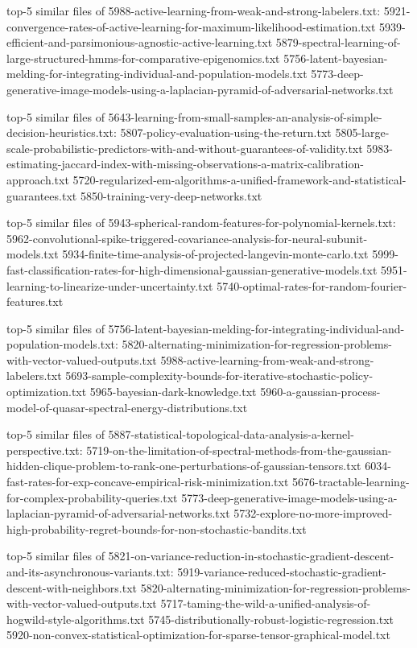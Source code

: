 \documentclass[11pt]{article}
\begin{document}
top-5 similar files of
5988-active-learning-from-weak-and-strong-labelers.txt:
5921-convergence-rates-of-active-learning-for-maximum-likelihood-estimation.txt
5939-efficient-and-parsimonious-agnostic-active-learning.txt
5879-spectral-learning-of-large-structured-hmms-for-comparative-epigenomics.txt
5756-latent-bayesian-melding-for-integrating-individual-and-population-models.txt
5773-deep-generative-image-models-using-a-laplacian-pyramid-of-adversarial-networks.txt

top-5 similar files of
5643-learning-from-small-samples-an-analysis-of-simple-decision-heuristics.txt:
5807-policy-evaluation-using-the-return.txt
5805-large-scale-probabilistic-predictors-with-and-without-guarantees-of-validity.txt
5983-estimating-jaccard-index-with-missing-observations-a-matrix-calibration-approach.txt
5720-regularized-em-algorithms-a-unified-framework-and-statistical-guarantees.txt
5850-training-very-deep-networks.txt

top-5 similar files of
5943-spherical-random-features-for-polynomial-kernels.txt:
5962-convolutional-spike-triggered-covariance-analysis-for-neural-subunit-models.txt
5934-finite-time-analysis-of-projected-langevin-monte-carlo.txt
5999-fast-classification-rates-for-high-dimensional-gaussian-generative-models.txt
5951-learning-to-linearize-under-uncertainty.txt
5740-optimal-rates-for-random-fourier-features.txt

top-5 similar files of
5756-latent-bayesian-melding-for-integrating-individual-and-population-models.txt:
5820-alternating-minimization-for-regression-problems-with-vector-valued-outputs.txt
5988-active-learning-from-weak-and-strong-labelers.txt
5693-sample-complexity-bounds-for-iterative-stochastic-policy-optimization.txt
5965-bayesian-dark-knowledge.txt
5960-a-gaussian-process-model-of-quasar-spectral-energy-distributions.txt

top-5 similar files of
5887-statistical-topological-data-analysis-a-kernel-perspective.txt:
5719-on-the-limitation-of-spectral-methods-from-the-gaussian-hidden-clique-problem-to-rank-one-perturbations-of-gaussian-tensors.txt
6034-fast-rates-for-exp-concave-empirical-risk-minimization.txt
5676-tractable-learning-for-complex-probability-queries.txt
5773-deep-generative-image-models-using-a-laplacian-pyramid-of-adversarial-networks.txt
5732-explore-no-more-improved-high-probability-regret-bounds-for-non-stochastic-bandits.txt

top-5 similar files of
5821-on-variance-reduction-in-stochastic-gradient-descent-and-its-asynchronous-variants.txt:
5919-variance-reduced-stochastic-gradient-descent-with-neighbors.txt
5820-alternating-minimization-for-regression-problems-with-vector-valued-outputs.txt
5717-taming-the-wild-a-unified-analysis-of-hogwild-style-algorithms.txt
5745-distributionally-robust-logistic-regression.txt
5920-non-convex-statistical-optimization-for-sparse-tensor-graphical-model.txt
\end{document}
